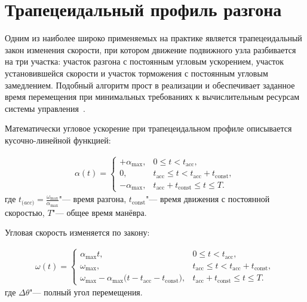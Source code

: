 \section{Трапецеидальный профиль разгона}
Одним из наиболее широко применяемых на практике является трапецеидальный закон изменения скорости, при котором движение подвижного узла разбивается на три участка: участок разгона с постоянным угловым ускорением, участок установившейся скорости и участок торможения с постоянным угловым замедлением. Подобный алгоритм прост в реализации и обеспечивает заданное время перемещения при минимальных требованиях к вычислительным ресурсам системы управления~\cite{Zhang2012, Austin2005}.

Математически угловое ускорение при трапецеидальном профиле описывается кусочно-линейной функцией:

\begin{equation}
	\begin{split}
		\label{eq:trap_alpha}
		\alpha(t) = 
		\begin{cases}
			+\alpha_{\max}, & 0 \leq t < t_{\mathrm{acc}},\\[6pt]
			0, & t_{\mathrm{acc}} \leq t < t_{\mathrm{acc}} + t_{\mathrm{const}},\\[6pt]
			-\alpha_{\max}, & t_{\mathrm{acc}} + t_{\mathrm{const}} \leq t \leq T.
		\end{cases}
	\end{split}
\end{equation}
где \(t_{\mathrm(acc)}=\frac{\omega_{\mathrm{max}}}{\alpha_{\max}}\)"--- время разгона, \(t_{\mathrm{const}}\)"--- время движения с постоянной скоростью, \(T\)"--- общее время манёвра.

Угловая скорость изменяется по закону:

\begin{equation}
	\begin{split}
		\label{eq:trap_omega}
		\omega(t) =
		\begin{cases}
			\alpha_{\max} t, & 0 \leq t < t_{\mathrm{acc}},\\[6pt]
			\omega_{\max}, & t_{\mathrm{acc}} \leq t < t_{\mathrm{acc}} + t_{\mathrm{const}},\\[6pt]
			\omega_{\max} - \alpha_{\max}\!\bigl(t - t_{\mathrm{acc}} - t_{\mathrm{const}}\bigr), 
			& t_{\mathrm{acc}} + t_{\mathrm{const}} \leq t \leq T.
		\end{cases}
	\end{split}
\end{equation}
где \(\Delta \theta\)"--- полный угол перемещения.

